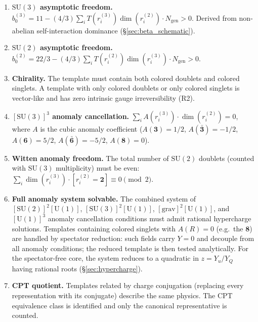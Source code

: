 \documentclass[11pt,a4paper]{article}
\theoremstyle{definition}
\newcommand{\SU}{\mathrm{SU}}
\newcommand{\U}{\mathrm{U}}
\begin{document}
\begin{enumerate}[label=\textbf{F\arabic*},nosep,leftmargin=3em]
  \item \textbf{$\SU(3)$ asymptotic freedom.}\quad
  $b_0^{(3)} = 11 - (4/3) \sum_i T(r_i^{(3)}) \dim(r_i^{(2)}) \cdot N_{\mathrm{gen}} > 0$.
  Derived from non-abelian self-interaction dominance (\S\ref{sec:beta_schematic}).

  \item \textbf{$\SU(2)$ asymptotic freedom.}\quad
  $b_0^{(2)} = 22/3 - (4/3) \sum_i T(r_i^{(2)}) \dim(r_i^{(3)}) \cdot N_{\mathrm{gen}} > 0$.

  \item \textbf{Chirality.}\quad
  The template must contain both colored doublets and colored singlets.
  A template with only colored doublets or only colored singlets is
  vector-like and has zero intrinsic gauge irreversibility (R2).

  \item \textbf{$[\SU(3)]^3$ anomaly cancellation.}\quad
  $\sum_i A(r_i^{(3)}) \cdot \dim(r_i^{(2)}) = 0$, where $A$ is the
  cubic anomaly coefficient ($A(\mathbf{3}) = 1/2$,
  $A(\bar{\mathbf{3}}) = -1/2$, $A(\mathbf{6}) = 5/2$,
  $A(\bar{\mathbf{6}}) = -5/2$, $A(\mathbf{8}) = 0$).

  \item \textbf{Witten anomaly freedom.}\quad
  The total number of $\SU(2)$ doublets (counted with $\SU(3)$ multiplicity)
  must be even: $\sum_i \dim(r_i^{(3)}) \cdot [r_i^{(2)} = \mathbf{2}]
  \equiv 0 \pmod{2}$.

  \item \textbf{Full anomaly system solvable.}\quad
  The combined system of $[\SU(2)]^2[\U(1)]$, $[\SU(3)]^2[\U(1)]$,
  $[\mathrm{grav}]^2[\U(1)]$, and $[\U(1)]^3$ anomaly cancellation
  conditions must admit rational hypercharge solutions.  Templates
  containing colored singlets with $A(R) = 0$ (e.g.\ the $\mathbf{8}$)
  are handled by spectator reduction: such fields carry $Y = 0$ and
  decouple from all anomaly conditions; the reduced template is then
  tested analytically.  For the spectator-free core, the system reduces
  to a quadratic in $z = Y_u/Y_Q$ having rational roots
  (\S\ref{sec:hypercharge}).

  \item \textbf{CPT quotient.}\quad
  Templates related by charge conjugation (replacing every representation
  with its conjugate) describe the same physics.  The CPT equivalence
  class is identified and only the canonical representative is counted.
\end{enumerate}
\end{document}
